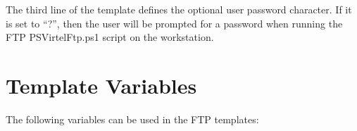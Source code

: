 \documentclass[letterpaper,10pt,english]{sphinxmanual}
\begin{document}
The third line of the template defines the optional user password character. If it is set to “?”, then the user will be prompted for a password when running the FTP PSVirtelFtp.ps1 script on the workstation.


\section{Template Variables}
\label{\detokenize{TN201905:template-variables}}
The following variables can be used in the FTP templates:

\begin{sphinxVerbatim}[commandchars=\\\{\}]
         
                 
          
                    

\end{sphinxVerbatim}
\end{document}
